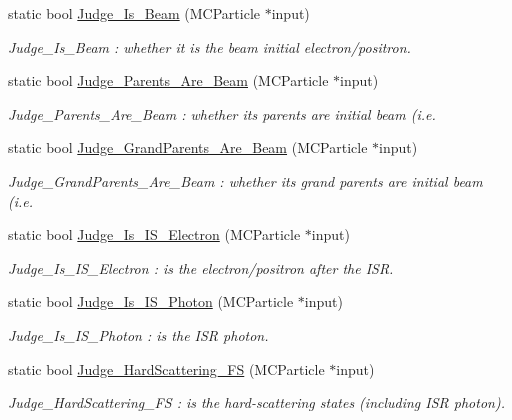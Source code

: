 \begin{DoxyCompactItemize}
\item 
static bool \hyperlink{classToolSet_1_1CMC_aa63f12865d46af350674c7dca3eb5437}{Judge\_\-Is\_\-Beam} (MCParticle $\ast$input)
\begin{DoxyCompactList}\small\item\em Judge\_\-Is\_\-Beam : whether it is the beam initial electron/positron. \item\end{DoxyCompactList}\item 
static bool \hyperlink{classToolSet_1_1CMC_a5ccf3aedd3c942ac6644748abaaf70fe}{Judge\_\-Parents\_\-Are\_\-Beam} (MCParticle $\ast$input)
\begin{DoxyCompactList}\small\item\em Judge\_\-Parents\_\-Are\_\-Beam : whether its parents are initial beam (i.e. \item\end{DoxyCompactList}\item 
static bool \hyperlink{classToolSet_1_1CMC_ad09856f709fff7320c382efd26a408e9}{Judge\_\-GrandParents\_\-Are\_\-Beam} (MCParticle $\ast$input)
\begin{DoxyCompactList}\small\item\em Judge\_\-GrandParents\_\-Are\_\-Beam : whether its grand parents are initial beam (i.e. \item\end{DoxyCompactList}\item 
static bool \hyperlink{classToolSet_1_1CMC_a0630c44bcd0eaf761f4b34e106f2b9d9}{Judge\_\-Is\_\-IS\_\-Electron} (MCParticle $\ast$input)
\begin{DoxyCompactList}\small\item\em Judge\_\-Is\_\-IS\_\-Electron : is the electron/positron after the ISR. \item\end{DoxyCompactList}\item 
static bool \hyperlink{classToolSet_1_1CMC_a688d2854fa645f4c3adad5013f4c9ba2}{Judge\_\-Is\_\-IS\_\-Photon} (MCParticle $\ast$input)
\begin{DoxyCompactList}\small\item\em Judge\_\-Is\_\-IS\_\-Photon : is the ISR photon. \item\end{DoxyCompactList}\item 
static bool \hyperlink{classToolSet_1_1CMC_a85fbb7bf0ef846c3ae1dcfeb27853911}{Judge\_\-HardScattering\_\-FS} (MCParticle $\ast$input)
\begin{DoxyCompactList}\small\item\em Judge\_\-HardScattering\_\-FS : is the hard-\/scattering states (including ISR photon). \item\end{DoxyCompactList}\item 

\end{DoxyCompactItemize}
